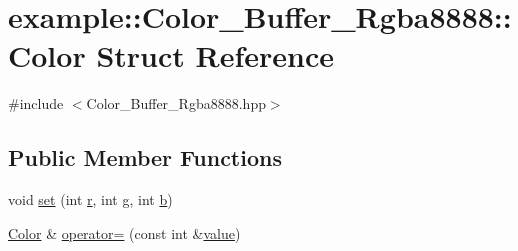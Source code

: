\hypertarget{structexample_1_1_color___buffer___rgba8888_1_1_color}{}\section{example\+:\+:Color\+\_\+\+Buffer\+\_\+\+Rgba8888\+:\+:Color Struct Reference}
\label{structexample_1_1_color___buffer___rgba8888_1_1_color}


{\ttfamily \#include $<$Color\+\_\+\+Buffer\+\_\+\+Rgba8888.\+hpp$>$}

\subsection*{Public Member Functions}
\begin{DoxyCompactItemize}
\item 
void \mbox{\hyperlink{structexample_1_1_color___buffer___rgba8888_1_1_color_ab468e761b5196e508eff6cf396d50cce}{set}} (int \mbox{\hyperlink{structexample_1_1_color___buffer___rgba8888_1_1_color_a3ae8419af50bed867580b5ca28b9e254}{r}}, int \mbox{\hyperlink{structexample_1_1_color___buffer___rgba8888_1_1_color_a02b8df3c9800b6d9efab7872ead00da1}{g}}, int \mbox{\hyperlink{structexample_1_1_color___buffer___rgba8888_1_1_color_a9213fba01a28ef7dbe871fe2669a0226}{b}})
\item 
\mbox{\hyperlink{structexample_1_1_color___buffer___rgba8888_1_1_color}{Color}} \& \mbox{\hyperlink{structexample_1_1_color___buffer___rgba8888_1_1_color_ada91a7b49ff32dc823e5cf733fc94b55}{operator=}} (const int \&\mbox{\hyperlink{structexample_1_1_color___buffer___rgba8888_1_1_color_aa8c3f5e3038dd7743aab9592023418e4}{value}})
\end{DoxyCompactItemize}
